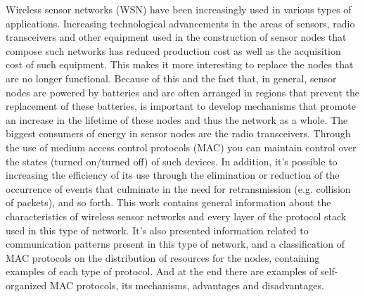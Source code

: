 \documentclass{uflamon}          %
\begin{document}
{Wireless sensor networks (WSN) have been increasingly used in various types of applications. Increasing technological advancements in the areas of sensors, radio transceivers and other equipment used in the construction of sensor nodes that compose such networks has reduced production cost as well as the acquisition cost of such equipment. This makes it more interesting to replace the nodes that are no longer functional. Because of this and the fact that, in general, sensor nodes are powered by batteries and are often arranged in regions that prevent the replacement of these batteries, is important to develop mechanisms that promote an increase in the lifetime of these nodes and thus the network as a whole. The biggest consumers of energy in sensor nodes are the radio transceivers. Through the use of medium access control protocols (MAC) you can maintain control over the states (turned on/turned off) of such devices. In addition, it's possible to increasing the efficiency of its use through the elimination or reduction of the occurrence of events that culminate in the need for retransmission (e.g. collision of packets), and so forth. This work contains general information about the characteristics of wireless sensor networks and every layer of the protocol stack used in this type of network. It's also presented information related to communication patterns present in this type of network, and a classification of MAC protocols on the distribution of resources for the nodes, containing examples of each type of protocol. And at the end there are examples of self-organized MAC protocols, its mechanisms, advantages and disadvantages.}                         %

\clearpage













\appendix
% 

\end{document}
